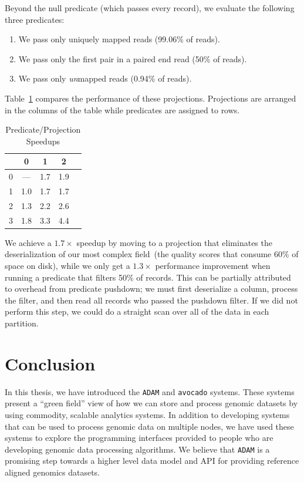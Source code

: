 \documentclass[masters]{ucbthesis}
\begin{document}
Beyond the null predicate (which passes every record), we evaluate the following three predicates:

\begin{enumerate}
\item We pass only uniquely mapped reads (99.06\% of reads).
\item We pass only the first pair in a paired end read (50\% of reads).
\item We pass only \emph{un}mapped reads (0.94\% of reads).
\end{enumerate}

Table~\ref{tab:ppp} compares the performance of these projections. Projections are arranged in the columns of the table
while predicates are assigned to rows.

\begin{table}[h]
\caption{Predicate/Projection Speedups}
\label{tab:ppp}
\begin{center}
\begin{tabular}{ l | c c c c }
\hline
& 0 & 1 & 2 \\
\hline
\hline
0 & --- & 1.7 & 1.9 \\
1 & 1.0 & 1.7 & 1.7 \\
2 & 1.3 & 2.2 & 2.6 \\
3 & 1.8 & 3.3 & 4.4 \\
\hline
\end{tabular}
\end{center}
\end{table}

We achieve a $1.7\times$ speedup by moving to a projection that eliminates the deserialization of our most
complex field~(the quality scores that consume 60\% of space on disk), while we only get a $1.3\times$
performance improvement when running a predicate that filters 50\% of records. This can be partially attributed
to overhead from predicate pushdown; we must first deserialize a column, process the filter, and then read all
records who passed the pushdown filter. If we did not perform this step, we could do a straight scan over all of
the data in each partition.

\chapter{Conclusion}

In this thesis, we have introduced the \texttt{ADAM} and \texttt{avocado} systems. These
systems present a ``green field'' view of how we can store and process genomic datasets
by using commodity, scalable analytics systems. In addition to developing systems that
can be used to process genomic data on multiple nodes, we have used these systems to
explore the programming interfaces provided to people who are developing genomic data
processing algorithms.  We believe that \texttt{ADAM} is a promising step towards a
higher level data model and API for providing reference aligned genomics datasets.
\end{document}
